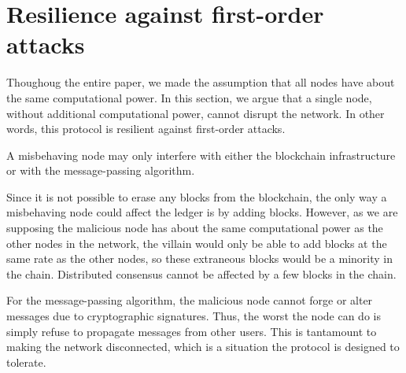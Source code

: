 \section{Resilience against first-order attacks}

Thoughoug the entire paper,
we made the assumption that all nodes have about the same computational power.
In this section,
we argue that a single node,
without additional computational power,
cannot disrupt the network.
In other words,
this protocol is resilient against first-order attacks.

A misbehaving node may only interfere with either the blockchain infrastructure
or with the message-passing algorithm.

Since it is not possible to erase any blocks from the blockchain,
the only way a misbehaving node could affect the ledger
is by adding blocks.
However,
as we are supposing the malicious node
has about the same computational power as the other nodes in the network,
the villain would only be able to add blocks at the same rate as the other nodes,
so these extraneous blocks would be a minority in the chain.
Distributed consensus cannot be affected by a few blocks in the chain.

For the message-passing algorithm,
the malicious node cannot forge or alter messages due to cryptographic signatures.
Thus,
the worst the node can do is simply refuse to propagate messages from other users.
This is tantamount to making the network disconnected,
which is a situation the protocol is designed to tolerate.
